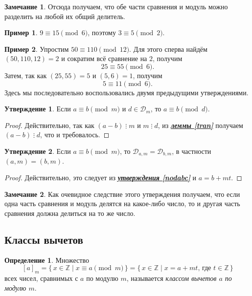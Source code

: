 \documentclass[14pt, a4paper]{extarticle}
\theoremstyle{definition}
\newtheorem*{definition}{Определение}
\newtheorem*{remark}{Замечание}
\newtheorem{example}{Пример}
\newtheorem{statement}{Утверждение}
\newcommand{\divisible}{\mathop{\vdots}}
\begin{document}
	\begin{remark}
		Отсюда получаем, что обе части сравнения и модуль можно разделить на любой их общий делитель.
	\end{remark}
	
	\begin{example}
		$9\equiv15\pmod{6}$, поэтому $3\equiv5\pmod{2}$.
	\end{example}

	\begin{example}
		Упростим $50\equiv110\pmod{12}$. Для этого сперва найдём $(50,110,12)=2$ и сократим всё сравнение на $2$, получим $$25\equiv55\pmod{6}.$$ Затем, так как $(25,55)=5$ и $(5,6)=1$, получим $$5\equiv11\pmod{6}.$$ Здесь мы последовательно воспользовались двумя предыдущими утверждениями.
	\end{example}

	\begin{statement}
		Если $a\equiv b\pmod{m}$ и $d\in\mathcal{D}_m$, то $a\equiv b\pmod{d}$.
	\end{statement}
	\begin{proof}
		Действительно, так как $(a-b)\divisible m$ и $m\divisible d$, из \hyperref[tran]{\textbf{\textit{леммы \ref*{tran}}}} получаем $(a-b)\divisible d$, что и требовалось.
	\end{proof}

	\begin{statement}
	\label{nodsr}
		Если $a\equiv b\pmod{m}$, то $\mathcal{D}_{a,m}=\mathcal{D}_{b,m}$, в частности $(a,m)=(b,m)$.
	\end{statement}
	\begin{proof}
		Действительно, это следует из \hyperref[nodabc]{\textbf{\textit{утверждения \ref*{nodabc}}}} и $a=b+mt$.
	\end{proof}
	\begin{remark}
		Как очевидное следствие этого утверждения получаем, что если одна часть сравнения и модуль делятся на какое-либо число, то и другая часть сравнения должна делиться на то же число.
	\end{remark}

\subsection{Классы вычетов}
\label{sysvych}

	\begin{definition}
		Множество $$[a]_m=\{\,x\in\mathbb{Z}\mid x\equiv a\pmod{m}\,\}=\{\,x\in\mathbb{Z}\mid x=a+mt\text{, где }t\in\mathbb{Z}\,\}$$ всех чисел, сравнимых с $a$ по модулю $m$, называется \emph{классом вычетов $a$ по модулю $m$}.
	\end{definition}
	
\end{document}
